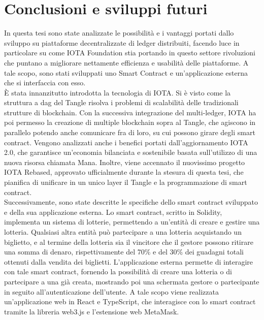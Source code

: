 \documentclass[12pt,a4paper,openright,twoside]{report}
\begin{document}
\chapter{Conclusioni e sviluppi futuri}
\label{chap:conclusion}
In questa tesi sono state analizzate le possibilità e i vantaggi portati dallo sviluppo su piattaforme decentralizzate di ledger distribuiti, facendo luce in particolare su come IOTA Foundation stia portando in questo settore rivoluzioni che puntano a migliorare nettamente efficienza e usabilità delle piattaforme. A tale scopo, sono stati sviluppati uno Smart Contract e un'applicazione esterna che si interfaccia con esso.\\
È stata innanzitutto introdotta la tecnologia di IOTA. Si è visto come la struttura a \acrshort{dag} del Tangle risolva i problemi di scalabilità delle tradizionali strutture di blockchain. Con la successiva integrazione del multi-ledger, IOTA ha poi permesso la creazione di multiple blockchain sopra al Tangle, che agiscono in parallelo potendo anche comunicare fra di loro, su cui possono girare degli smart contract. Vengono analizzati anche i benefici portati dall'aggiornamento IOTA 2.0, che garantisce un'economia bilanciata e sostenibile basata sull'utilizzo di una nuova risorsa chiamata Mana. Inoltre, viene accennato il nuovissimo progetto IOTA Rebased, approvato ufficialmente durante la stesura di questa tesi, che pianifica di unificare in un unico layer il Tangle e la programmazione di smart contract.\\
Successivamente, sono state descritte le specifiche dello smart contract sviluppato e della sua applicazione esterna. Lo smart contract, scritto in Solidity, implementa un sistema di lotterie, permettendo a un'entità di creare e gestire una lotteria. Qualsiasi altra entità può partecipare a una lotteria acquistando un biglietto, e al termine della lotteria sia il vincitore che il gestore possono ritirare una somma di denaro, rispettivamente del 70\% e del 30\% dei guadagni totali ottenuti dalla vendita dei biglietti. L'applicazione esterna permette di interagire con tale smart contract, fornendo la possibilità di creare una lotteria o di partecipare a una già creata, mostrando poi una schermata gestore o partecipante in seguito all'autenticazione dell'utente. A tale scopo viene realizzata un'applicazione web in React e TypeScript, che interagisce con lo smart contract tramite la libreria web3.js e l'estensione web MetaMask.\\
\end{document}
